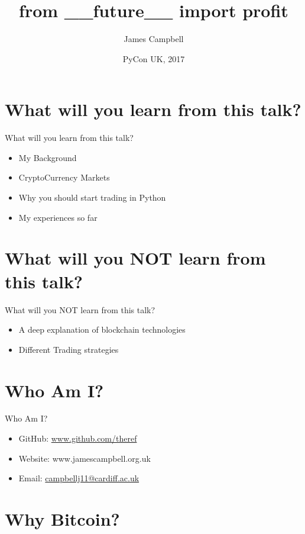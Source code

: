 \documentclass{beamer}
\title{from \_\_future\_\_ import profit}
\author{James Campbell}
\institute[Cardiff University]
  {
  Department of Mathematics\\
  Cardiff University
  }
\date{PyCon UK, 2017}
\begin{document}
\begin{frame}
  \titlepage
\end{frame}

\section{What will you learn from this talk?}

\begin{frame}{What will you learn from this talk?}
  \begin{itemize}
    \item My Background
    \item CryptoCurrency Markets
    \item Why you should start trading in Python
    \item My experiences so far
  \end{itemize}
\end{frame}

\section{What will you NOT learn from this talk?}

\begin{frame}{What will you NOT learn from this talk?}
  \begin{itemize}
    \item A deep explanation of blockchain technologies
    \item Different Trading strategies
  \end{itemize}
\end{frame}

\section{Who Am I?}

\begin{frame}{Who Am I?}
  \begin{itemize}
    \item GitHub: \href{https://github.com/theref}{www.github.com/theref}
    \item Website: www.jamescampbell.org.uk
    \item Email: \href{mailto:campbellj11@cardiff.ac.uk}{campbellj11@cardiff.ac.uk}
  \end{itemize}
\end{frame}

\section{Why Bitcoin?}
\end{document}
